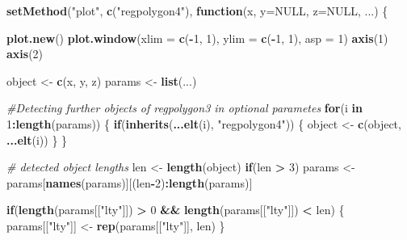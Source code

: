 \documentclass[]{article}
\newenvironment{Shaded}{\begin{snugshade}}{\end{snugshade}}
\newcommand{\KeywordTok}[1]{\textcolor[rgb]{0.13,0.29,0.53}{\textbf{#1}}}
\newcommand{\DataTypeTok}[1]{\textcolor[rgb]{0.13,0.29,0.53}{#1}}
\newcommand{\DecValTok}[1]{\textcolor[rgb]{0.00,0.00,0.81}{#1}}
\newcommand{\StringTok}[1]{\textcolor[rgb]{0.31,0.60,0.02}{#1}}
\newcommand{\CommentTok}[1]{\textcolor[rgb]{0.56,0.35,0.01}{\textit{#1}}}
\newcommand{\OtherTok}[1]{\textcolor[rgb]{0.56,0.35,0.01}{#1}}
\newcommand{\ControlFlowTok}[1]{\textcolor[rgb]{0.13,0.29,0.53}{\textbf{#1}}}
\newcommand{\OperatorTok}[1]{\textcolor[rgb]{0.81,0.36,0.00}{\textbf{#1}}}
\newcommand{\NormalTok}[1]{#1}
\begin{document}
\begin{Shaded}
\begin{Highlighting}[]
\KeywordTok{setMethod}\NormalTok{(}\StringTok{"plot"}\NormalTok{, }\KeywordTok{c}\NormalTok{(}\StringTok{"regpolygon4"}\NormalTok{), }\ControlFlowTok{function}\NormalTok{(x, }\DataTypeTok{y=}\OtherTok{NULL}\NormalTok{, }\DataTypeTok{z=}\OtherTok{NULL}\NormalTok{, ...) \{}
  
  \KeywordTok{plot.new}\NormalTok{()}
  \KeywordTok{plot.window}\NormalTok{(}\DataTypeTok{xlim =} \KeywordTok{c}\NormalTok{(}\OperatorTok{-}\DecValTok{1}\NormalTok{, }\DecValTok{1}\NormalTok{), }\DataTypeTok{ylim =} \KeywordTok{c}\NormalTok{(}\OperatorTok{-}\DecValTok{1}\NormalTok{, }\DecValTok{1}\NormalTok{), }\DataTypeTok{asp =} \DecValTok{1}\NormalTok{)}
  \KeywordTok{axis}\NormalTok{(}\DecValTok{1}\NormalTok{)}
  \KeywordTok{axis}\NormalTok{(}\DecValTok{2}\NormalTok{)}
  
\NormalTok{  object <-}\StringTok{ }\KeywordTok{c}\NormalTok{(x, y, z)}
\NormalTok{  params <-}\StringTok{ }\KeywordTok{list}\NormalTok{(...)}
  
  \CommentTok{#Detecting further objects of regpolygon3 in optional parametes}
  \ControlFlowTok{for}\NormalTok{(i }\ControlFlowTok{in} \DecValTok{1}\OperatorTok{:}\KeywordTok{length}\NormalTok{(params)) \{}
    \ControlFlowTok{if}\NormalTok{(}\KeywordTok{inherits}\NormalTok{(}\KeywordTok{...elt}\NormalTok{(i), }\StringTok{"regpolygon4"}\NormalTok{)) \{}
\NormalTok{      object <-}\StringTok{ }\KeywordTok{c}\NormalTok{(object, }\KeywordTok{...elt}\NormalTok{(i))}
\NormalTok{    \}}
\NormalTok{  \}}
  
  \CommentTok{# detected object lengths}
\NormalTok{  len <-}\StringTok{ }\KeywordTok{length}\NormalTok{(object)}
  \ControlFlowTok{if}\NormalTok{(len }\OperatorTok{>}\StringTok{ }\DecValTok{3}\NormalTok{)}
\NormalTok{    params <-}\StringTok{ }\NormalTok{params[}\KeywordTok{names}\NormalTok{(params)][(len}\OperatorTok{-}\DecValTok{2}\NormalTok{)}\OperatorTok{:}\KeywordTok{length}\NormalTok{(params)]}
  
  \ControlFlowTok{if}\NormalTok{(}\KeywordTok{length}\NormalTok{(params[[}\StringTok{"lty"}\NormalTok{]]) }\OperatorTok{>}\StringTok{ }\DecValTok{0} \OperatorTok{&&}\StringTok{ }\KeywordTok{length}\NormalTok{(params[[}\StringTok{"lty"}\NormalTok{]]) }\OperatorTok{<}\StringTok{ }\NormalTok{len) \{}
\NormalTok{    params[[}\StringTok{"lty"}\NormalTok{]] <-}\StringTok{ }\KeywordTok{rep}\NormalTok{(params[[}\StringTok{"lty"}\NormalTok{]], len)}
\NormalTok{  \}}
  

\end{Highlighting}
\end{Shaded}
\end{document}
